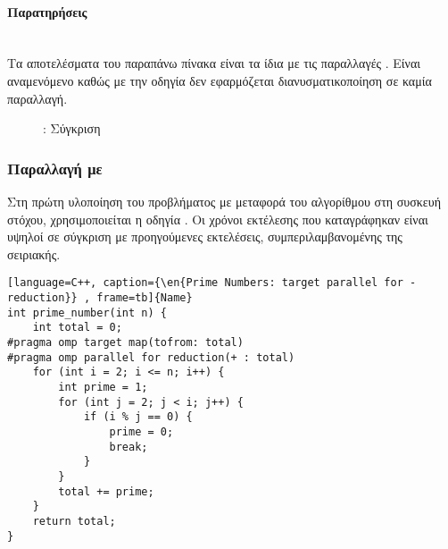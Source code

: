 \paragraph{Παρατηρήσεις}
\ \\
Τα αποτελέσματα του παραπάνω πίνακα είναι τα ίδια με τις παραλλαγές . Είναι αναμενόμενο καθώς με την οδηγία  δεν εφαρμόζεται διανυσματικοποίηση σε καμία παραλλαγή.
\begin{figure}[h]
\begin{center}
\resizebox{0.6\textwidth}{!} {
}%
\end{center}
\caption{: Σύγκριση }
\end{figure}

\clearpage

\clearpage
\subsubsection{Παραλλαγή με }
Στη πρώτη υλοποίηση του προβλήματος με μεταφορά του αλγορίθμου στη συσκευή στόχου, χρησιμοποιείται η οδηγία . Οι χρόνοι εκτέλεσης που καταγράφηκαν είναι υψηλοί σε σύγκριση με προηγούμενες εκτελέσεις, συμπεριλαμβανομένης της σειριακής.
\begin{spacing}{1.0}
\begin{lstlisting}[language=C++, caption={\en{Prime Numbers: target parallel for - reduction}} , frame=tb]{Name}
int prime_number(int n) {
    int total = 0;
#pragma omp target map(tofrom: total)
#pragma omp parallel for reduction(+ : total)
    for (int i = 2; i <= n; i++) {
        int prime = 1;
        for (int j = 2; j < i; j++) {
            if (i % j == 0) {
                prime = 0;
                break;
            }
        }
        total += prime;
    }
    return total;
}
\end{lstlisting}
\end{spacing}

